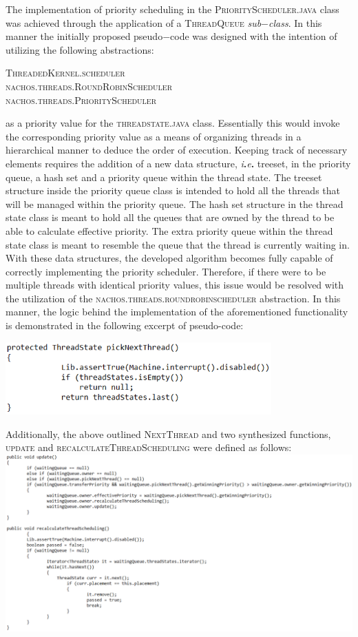 \documentclass[12pt]{article}
\begin{document}
{The implementation of priority scheduling in the \textsc{PriorityScheduler.java} class was achieved through the application of a \textsc{ThreadQueue} \textit{sub$-$class}. In this manner the initially proposed pseudo$-$code was designed with the intention of utilizing the following abstractions:\begin{center}\textsc{
ThreadedKernel.scheduler\\nachos.threads.RoundRobinScheduler\\nachos.threads.PriorityScheduler
}\end{center}
as a priority value for the \textsc{threadstate.java} class. Essentially this would invoke the corresponding priority value as a means of organizing threads in a hierarchical manner to deduce the order of execution. Keeping track of necessary elements requires the addition of a new data structure, \textit{i}\textbf{.}\textit{e}\textbf{.} treeset, in the priority queue, a hash set and a priority queue within the thread state. The treeset structure inside the priority queue class is intended to hold all the threads that will be managed within the priority queue. The hash set structure in the thread state class is meant to hold all the queues that are owned by the thread to be able to calculate effective priority. The extra priority queue within the thread state class is meant to resemble the queue that the thread is currently waiting in. With these data structures, the developed algorithm becomes fully capable of correctly implementing the priority scheduler. Therefore, if there were to be multiple threads with identical priority values, this issue would be resolved with the utilization of the \textsc{nachos.threads.roundrobinscheduler} abstraction. In this manner, the logic behind the implementation of the aforementioned functionality is demonstrated in the following excerpt of pseudo-code:
\begin{center} \includegraphics[width=102mm]{pic8.png} \end{center}
Additionally, the above outlined \textsc{NextThread} and two synthesized functions,
\textsc{update} and \textsc{recalculateThreadScheduling} were defined as follows:\\
\includegraphics[width=180mm]{pic9.png}\\
}
\end{document}
